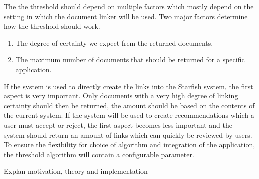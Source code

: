 The the threshold should depend on multiple factors which mostly depend on the setting in which the document linker will be used. Two major factors determine how the threshold should work.
\begin{enumerate}[1.]
	\item The degree of certainty we expect from the returned documents.
	\item The maximum number of documents that should be returned for a specific application.
\end{enumerate}
If the system is used to directly create the links into the Starfish system, the first aspect is very important. Only documents with a very high degree of linking certainty should then be returned, the amount should be based on the contents of the current system. If the system will be used to create recommendations which a user must accept or reject, the first aspect becomes less important and the system should return an amount of links which can quickly be reviewed by users. To ensure the flexibility for choice of algorithm and integration of the application, the threshold algorithm will contain a configurable parameter.



Explan motivation, theory and implementation